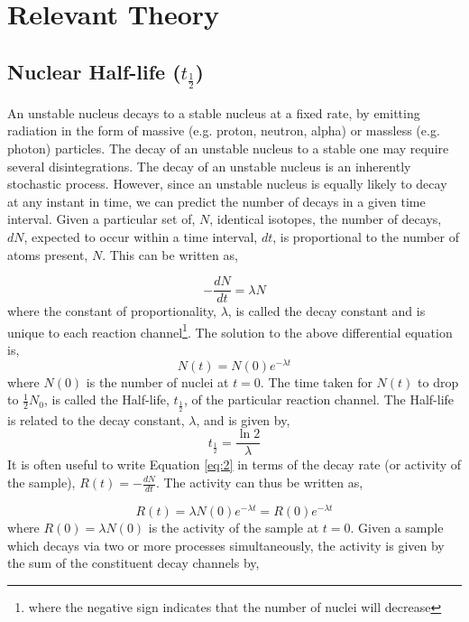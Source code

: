 \documentclass[]{article}
\begin{document}
\section{Relevant Theory}
\subsection{Nuclear Half-life ($t_{\frac{1}{2}}$) }
An unstable nucleus decays to a stable nucleus at a fixed rate, by emitting radiation in the form of massive (e.g. proton, neutron, alpha) or massless (e.g. photon) particles. The decay of an unstable nucleus to a stable one may require several disintegrations. The decay of an unstable nucleus is an inherently stochastic process. However, since an unstable nucleus is equally likely to decay at any instant in time, we can predict the number of decays in a given time interval. Given a particular set of, $N$, identical isotopes, the number of decays, $dN$, expected to occur within a time interval, $dt$, is proportional to the number of atoms present, $N$. This can be written as,

\begin{equation}\label{eq:1}
-\frac{ dN}{dt} = \lambda N
\end{equation}
where the constant of proportionality, $\lambda$, is called the decay constant and is unique to each reaction channel\footnote{where the negative sign indicates that the number of nuclei will decrease}. The solution to the above differential equation is,
\begin{equation}\label{eq:2}
N(t) = N(0) e^{-\lambda t}
\end{equation}
where $N(0)$ is the number of nuclei at $t=0$. The time taken for $N(t)$ to drop to $\frac{1}{2}N_0$, is called the Half-life, $t_{\frac{1}{2}}$, of the particular reaction channel. The Half-life is related to the decay constant, $\lambda$, and is given by, 
\begin{equation}\label{eq:3}
t_{\frac{1}{2}} = \frac{\ln{2}}{\lambda}
\end{equation}
It is often useful to write Equation \ref{eq:2} in terms of the decay rate (or activity of the sample), $R(t) = -\frac{ dN}{dt}$. The activity can thus be written as,

\begin{equation}\label{eq:4}
R(t) = \lambda N(0) e^{-\lambda t} = R(0) e^{-\lambda t}
\end{equation}
where $R(0) = \lambda N(0)$ is the activity of the sample at $t=0$. Given a sample which decays via two or more processes simultaneously, the activity is given by the sum of the constituent decay channels by,
\end{document}
